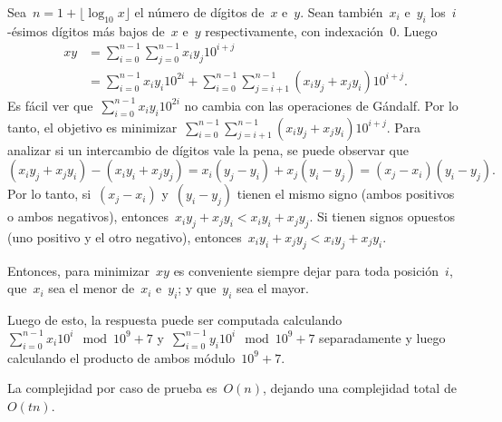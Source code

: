 
Sea~$n = 1 + \lfloor \log_{10} x \rfloor$ el número de dígitos de~$x$ e~$y$. Sean
también~$x_i$ e~$y_i$ los~$i$-ésimos dígitos más bajos de~$x$ e~$y$ respectivamente,
con indexación~$0$. Luego
\begin{align*}
  xy &= \sum_{i = 0}^{n-1} \sum_{j = 0}^{n-1}x_iy_j 10^{i + j} \\
     &= \sum_{i = 0}^{n-1}x_iy_i 10^{2i} + \sum_{i = 0}^{n-1} \sum_{j = i + 1}^{n -
       1} \left(x_iy_j + x_jy_i\right) 10^{i + j}.
\end{align*}
Es fácil ver que~$\sum_{i = 0}^{n-1}x_iy_i 10^{2i}$ no cambia con las operaciones de
Gándalf. Por lo tanto, el objetivo es
minimizar~$\sum_{i = 0}^{n-1} \sum_{j = i + 1}^{n - 1} \left(x_iy_j + x_jy_i\right)
10^{i + j}$. Para analizar si un intercambio de dígitos vale la pena, se puede
observar que
\begin{equation*}
  \left(x_iy_j + x_jy_i\right) - \left(x_iy_i + x_jy_j\right) = x_i\left(y_j - y_i\right) + x_j\left(y_i - y_j\right) = \left(x_j
    - x_i\right) \left(y_i - y_j\right).
\end{equation*}
Por lo tanto, si~$(x_j - x_i)$ y~$(y_i - y_j)$ tienen el mismo signo (ambos positivos
o ambos negativos), entonces~$x_iy_j + x_jy_i < x_iy_i + x_jy_j$. Si tienen signos
opuestos (uno positivo y el otro negativo),
entonces~$x_iy_i + x_jy_j < x_iy_j + x_jy_i$.

Entonces, para minimizar~$xy$ es conveniente siempre dejar para toda posición~$i$,
que~$x_i$ sea el menor de~$x_i$ e~$y_i$; y que~$y_i$ sea el mayor.

Luego de esto, la respuesta puede ser computada
calculando~$\sum_{i=0}^{n-1}x_i10^{i} \mod 10^9 + 7$
y~$\sum_{i=0}^{n-1}y_i10^{i} \mod 10^9 + 7$ separadamente y luego calculando el
producto de ambos módulo~$10^9 + 7$.

La complejidad por caso de prueba es~$O(n)$, dejando una complejidad total
de~$O(tn)$.

